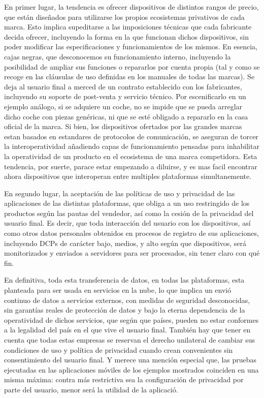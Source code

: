 En primer lugar, la tendencia es ofrecer dispositivos de distintos rangos de precio, que están diseñados para utilizarse los propios ecosistemas privativos de cada marca. Esto implica supeditarse a las imposiciones técnicas que cada fabricante decida ofrecer, incluyendo la forma en la que funcionan dichos dispositivos, sin poder modificar las especificaciones y funcionamientos de los mismos. En esencia, cajas negras, que desconocemos su funcionamiento interno, incluyendo la posibilidad de ampliar sus funciones o repararlos por cuenta propia (tal y como se recoge en las cláusulas de uso definidas en los manuales de todas las marcas). Se deja al usuario final a merced de un contrato establecido con los fabricantes, incluyendo su soporte de post-venta y servicio técnico. Por escenificarlo en un ejemplo análogo, si se adquiere un coche, no se impide que se pueda arreglar dicho coche con piezas genéricas, ni que se esté obligado a repararlo en la casa oficial de la marca. Si bien, los dispositivos ofertados por las grandes marcas estan basados en estandares de protocolos de comunicación, se aseguran de torcer la interoperatividad añadiendo capas de funcionamiento pensadas para inhabilitar la operatividad de un producto en el ecosistema de una marca competidora. Esta tendencia, por suerte, parace estar empezando a diluirse, y es mas facil encontrar ahora dispositivos que interoperan entre multiples plataformas simultanemente.

\vspace{1cm}

En segundo lugar, la aceptación de las políticas de uso y privacidad de las aplicaciones de las distintas plataformas, que obliga a un uso restringido de los productos según las pautas del vendedor, así como la cesión de la privacidad del usuario final. Es decir, que toda interacción del usuario con los dispositivos, así como otros datos personales obtenidos en procesos de registro de sus aplicaciones, incluyendo DCPs de carácter bajo, medios, y alto según que dispositivos, será monitorizados y enviados a servidores para ser procesados, sin tener claro con qué fin.

\vspace{1cm}

En definitiva, toda esta transferencia de datos, en todas las plataformas, esta planteada para ser usada en servicios en la nube, lo que implica un envió continuo de datos a servicios externos, con medidas de seguridad desconocidas, sin garantías reales de protección de datos y bajo la eterna dependencia de la operatividad de dichos servicios, que según que países, pueden no estar conformes a la legalidad del país en el que vive el usuario final. También hay que tener en cuenta que todas estas empresas se reservan el derecho unilateral de cambiar sus condiciones de uso y política de privacidad cuando crean convenientes sin consentimiento del usuario final. Y merece una mención especial que, las pruebas ejecutadas en las aplicaciones móviles de los ejemplos mostrados coinciden en una misma máxima: contra más restrictiva sea la configuración de privacidad por parte del usuario, menor será la utilidad de la aplicació.

